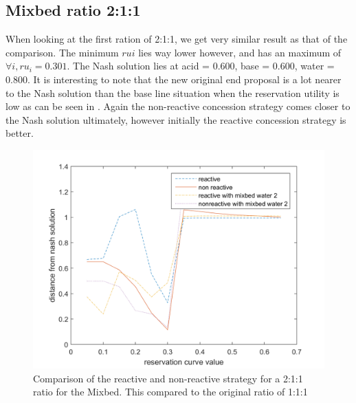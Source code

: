 \subsection{Mixbed ratio 2:1:1}
When looking at the first ration of 2:1:1, we get very similar result as that of the comparison. The minimum $rui$ lies way lower however, and has an maximum of $\forall i, ru_i = 0.301$. The Nash solution lies at acid = 0.600, base = 0.600, water = 0.800.
It is interesting to note that the new original end proposal is a lot nearer to the Nash solution than the base line situation when the reservation utility is low as can be seen in . Again the non-reactive concession strategy comes closer to the Nash solution ultimately, however initially the reactive concession strategy is better. 
\begin{figure}[h]
	\centering
	\includegraphics[width=0.7\linewidth]{img/reactivevsnonreactiveMixbed2.png}
	\caption{Comparison of the reactive and non-reactive strategy for a 2:1:1 ratio for the Mixbed. This compared to the original ratio of 1:1:1}
	\label{fig:reactivevsnon-reactiveMixbed2}
\end{figure}


